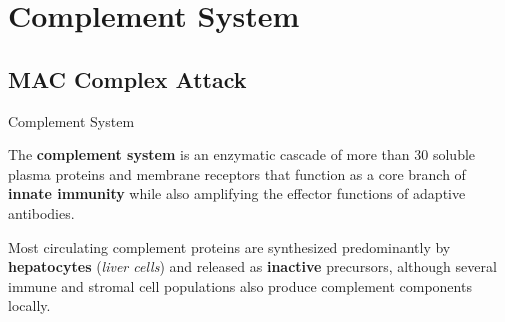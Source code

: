 
\section{Complement System}
  \label{sec:complement}
  
  \subsection{MAC Complex Attack}

    \begin{core}{Complement System}

      The \textbf{complement system} is an enzymatic cascade of more than 30 soluble plasma proteins and membrane receptors that function as a core branch of \textbf{innate immunity} while also amplifying the effector functions of adaptive antibodies.

      Most circulating complement proteins are synthesized predominantly by \textbf{hepatocytes} (\textit{liver cells}) and released as \textbf{inactive} precursors, although several immune and stromal cell populations also produce complement components locally.

    \end{core}

